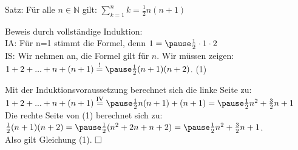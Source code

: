 \begin{frame}[fragile]


Satz: Für alle $n \in \mathbb{N}$ gilt: $\sum\limits_{k=1}^{n}k= \frac{1}{2}n(n+1)$ \pause

Beweis durch vollständige Induktion: \\
IA: \pause Für n=1 stimmt die Formel, denn \pause $1 = \pause \frac{1}{2}\cdot 1 \cdot 2$ \\ \pause
IS: \pause Wir nehmen an, die Formel gilt für $n$. Wir müssen zeigen: \pause \\
$1 + 2 + ... + n + (n+1)  \overset{!}{=} \pause \frac{1}{2}(n+1)(n+2)$.  \quad \quad (1) \\ \pause

Mit der Induktionsvoraussetzung berechnet sich die linke Seite zu: \\
$1 + 2 + ... + n + (n+1)  \overset{\text{IV}}{=}  \pause \frac{1}{2}n(n+1) + (n+1) = \pause \frac{1}{2}n^2 + \frac{3}{2}n +1$ \\ \pause
Die rechte Seite von (1) berechnet sich zu: \\
 $\frac{1}{2}(n+1)(n+2) = \pause \frac{1}{2}(n^2+2n+n+2) = \pause \frac{1}{2}n^2+ \frac{3}{2}n+1$. \\ \pause
Also gilt Gleichung (1).  $ \hfill \square$



\end{frame}




